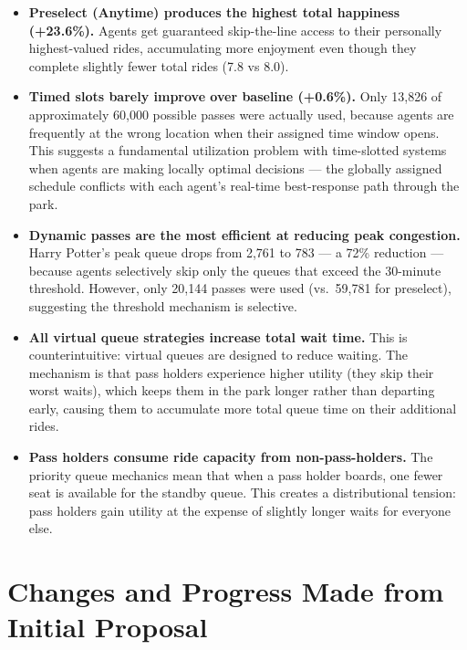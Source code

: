 \documentclass[11pt]{article}
\begin{document}
\begin{itemize}
    \item \textbf{Preselect (Anytime) produces the highest total happiness (+23.6\%).} Agents get guaranteed skip-the-line access to their personally highest-valued rides, accumulating more enjoyment even though they complete slightly fewer total rides (7.8 vs 8.0).

    \item \textbf{Timed slots barely improve over baseline (+0.6\%).} Only 13,826 of approximately 60,000 possible passes were actually used, because agents are frequently at the wrong location when their assigned time window opens. This suggests a fundamental utilization problem with time-slotted systems when agents are making locally optimal decisions --- the globally assigned schedule conflicts with each agent's real-time best-response path through the park.

    \item \textbf{Dynamic passes are the most efficient at reducing peak congestion.} Harry Potter's peak queue drops from 2,761 to 783 --- a 72\% reduction --- because agents selectively skip only the queues that exceed the 30-minute threshold. However, only 20,144 passes were used (vs.\ 59,781 for preselect), suggesting the threshold mechanism is selective.

    \item \textbf{All virtual queue strategies increase total wait time.} This is counterintuitive: virtual queues are designed to reduce waiting. The mechanism is that pass holders experience higher utility (they skip their worst waits), which keeps them in the park longer rather than departing early, causing them to accumulate more total queue time on their additional rides.

    \item \textbf{Pass holders consume ride capacity from non-pass-holders.} The priority queue mechanics mean that when a pass holder boards, one fewer seat is available for the standby queue. This creates a distributional tension: pass holders gain utility at the expense of slightly longer waits for everyone else.
\end{itemize}

\section{Changes and Progress Made from Initial Proposal}
\end{document}
